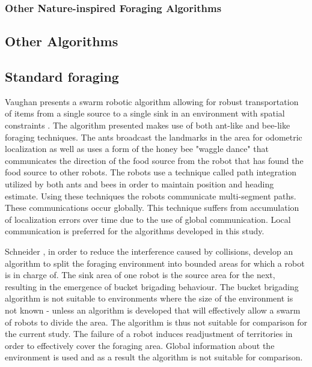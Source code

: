 \subsubsection{Other Nature-inspired Foraging Algorithms}

\subsection{Other Algorithms}

\subsection{Standard foraging}
Vaughan presents a swarm robotic algorithm allowing for robust transportation of items from a single source to a single sink in an environment with spatial constraints \cite{vaughan2000blazing}. The algorithm presented makes use of both ant-like and bee-like foraging techniques. The ants broadcast the landmarks in the area for odometric localization as well as uses a form of the  honey bee "waggle dance" that communicates the direction of the food source from the robot that has found the food source to other robots. The robots use a technique called path integration utilized by both ants and bees in order to maintain position and heading estimate. Using these techniques the robots communicate multi-segment paths. These communications occur globally. This technique suffers from accumulation of localization errors over time due to the use of global communication. Local communication is preferred for the algorithms developed in this study.   %

Schneider \cite{schneider1998territorial}, in order to reduce the interference caused by collisions, develop an algorithm to split the foraging environment into bounded areas for which a robot is in charge of. The sink area of one robot is the source area for the next, resulting in the emergence of bucket brigading behaviour. The bucket brigading algorithm is not suitable to environments where the size of the environment is not known - unless an algorithm is developed that will effectively allow a swarm of robots to divide the area. The algorithm is thus not suitable for comparison for the current study. The failure of a robot induces readjustment of territories in order to effectively cover the foraging area. Global information about the environment is used and as a result the algorithm is not suitable for comparison. %

